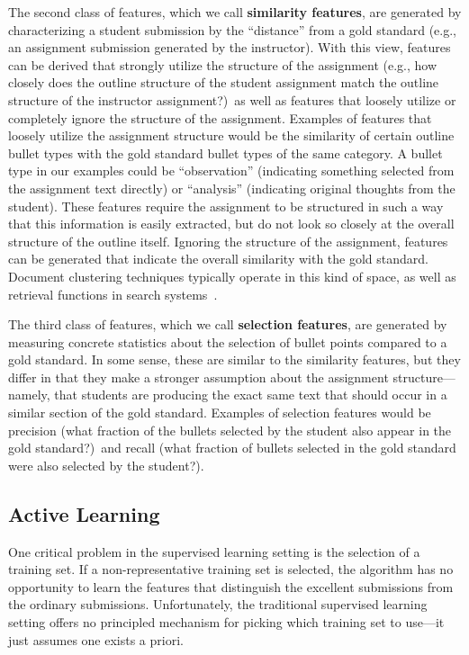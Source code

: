 The second class of features, which we call \textbf{similarity features},
are generated by characterizing a student submission by the ``distance''
from a gold standard (e.g., an assignment submission generated by the
instructor). With this view, features can be derived that strongly utilize
the structure of the assignment (e.g., how closely does the outline
structure of the student assignment match the outline structure of the
instructor assignment?)\ as well as features that loosely utilize or
completely ignore the structure of the assignment. Examples of features
that loosely utilize the assignment structure would be the similarity of
certain outline bullet types with the gold standard bullet types of the
same category. A bullet type in our examples could be ``observation''
(indicating something selected from the assignment text directly) or
``analysis'' (indicating original thoughts from the student). These
features require the assignment to be structured in such a way that this
information is easily extracted, but do not look so closely at the overall
structure of the outline itself. Ignoring the structure of the assignment,
features can be generated that indicate the overall similarity with the
gold standard. Document clustering techniques typically operate in this
kind of space, as well as retrieval functions in search
systems~\cite{Robertson:1994:SIGIR, Robertson:1996:TREC-3}.

The third class of features, which we call \textbf{selection features},
are generated by measuring concrete statistics about the selection of
bullet points compared to a gold standard. In some sense, these are similar
to the similarity features, but they differ in that they make a stronger
assumption about the assignment structure---namely, that students are
producing the exact same text that should occur in a similar section of the
gold standard. Examples of selection features would be precision (what
fraction of the bullets selected by the student also appear in the gold
standard?)\ and recall (what fraction of bullets selected in the gold
standard were also selected by the student?).

\subsection{Active Learning}

One critical problem in the supervised learning setting is the selection
of a training set. If a non-representative training set is selected, the
algorithm has no opportunity to learn the features that distinguish the
excellent submissions from the ordinary submissions. Unfortunately, the
traditional supervised learning setting offers no principled mechanism for
picking which training set to use---it just assumes one exists a priori.

